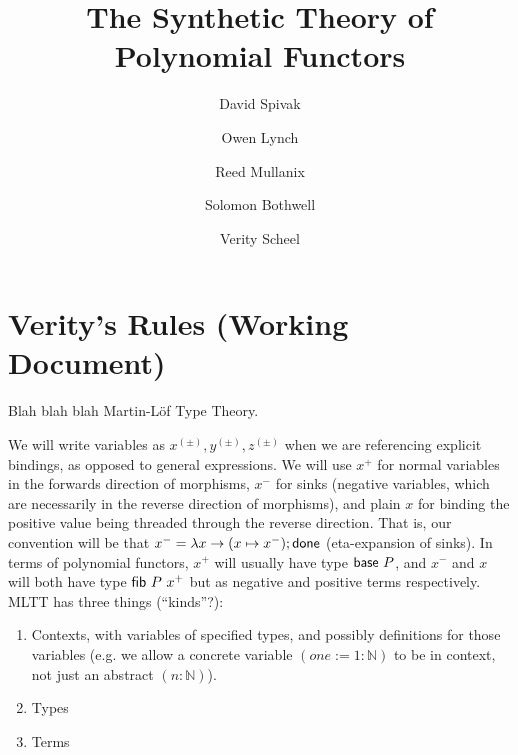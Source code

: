 \documentclass[final]{amsart}
\title{The Synthetic Theory of Polynomial Functors}
\author{David Spivak}
\author{Owen Lynch}
\author{Reed Mullanix}
\author{Solomon Bothwell}
\author{Verity Scheel}
\begin{document}
\maketitle

\section{Verity's Rules (Working Document)}

Blah blah blah Martin-L\"of Type Theory.

We will write variables as $x^{(\pm)}, y^{(\pm)}, z^{(\pm)}$ when we are referencing explicit bindings, as opposed to general expressions.
We will use $x^{+}$ for normal variables in the forwards direction of morphisms, $x^{-}$ for sinks (negative variables, which are necessarily in the reverse direction of morphisms), and plain $x$ for binding the positive value being threaded through the reverse direction.
That is, our convention will be that $x^{-} = \lambda x \to (x \mapsto x^{-}); \mathsf{done}$ (eta-expansion of sinks).
In terms of polynomial functors, $x^{+}$ will usually have type $\mathsf{base}\ P$, and $x^{-}$ and $x$ will both have type $\mathsf{fib}\ P\ x^{+}$ but as negative and positive terms respectively.\\

MLTT has three things (``kinds''?):
\begin{enumerate}
  \item Contexts, with variables of specified types, and possibly definitions for those variables (e.g. we allow a concrete variable $(one := 1 : \mathbb{N})$ to be in context, not just an abstract $(n : \mathbb{N})$).
  \item Types
  \item Terms
\end{enumerate}
\end{document}
